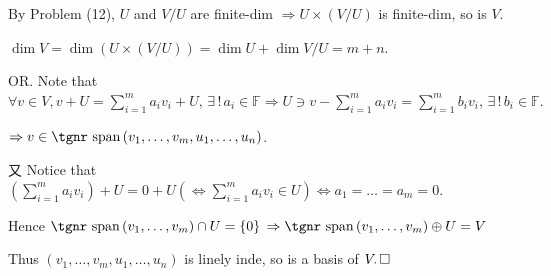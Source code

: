 \documentclass[a4paper, 11pt, UTF8]{article}
\def\Spn{{\textup{\tgnr span}}\,}
\def\Fbb{{\mathbb{F}}}
\def\Or{{\large O{\footnotesize R.} }}
\begin{document}
\begin{large}
\par\quad
By Problem (12), $U$ and $V/U$ are finite-dim $\Rightarrow U\times(V/U)$ is finite-dim, so is $V$.\par\quad
$\dim V=\dim\left(U\times(V/U)\right)=\dim U+\dim V/U=m+n.$\par\quad
\Or Note that $\forall v\in V,v+U=\sum\limits_{i=1}^m a_i v_i+U,\,\exists\,!\,a_i\in\Fbb\Rightarrow U\ni v-\sum\limits_{i=1}^m a_i v_i=\sum\limits_{i=1}^m b_i v_i,\,\exists\,!\,b_i\in\Fbb.$\par\quad\qquad\qquad\qquad\!\!\!
$\Rightarrow v\in\Spn(v_1,\dots,v_m,u_1,\dots,u_n)$.\par\quad
又 Notice that $(\sum\limits_{i=1}^m a_i v_i)+U=0+U(\Longleftrightarrow\sum\limits_{i=1}^m a_i v_i\in U)\Longleftrightarrow a_1=\dots=a_m=0.$\par\quad
Hence $\Spn(v_1,\dots,v_m)\cap U=\{0\}$
$\Rightarrow\Spn(v_1,\dots,v_m)\oplus U=V$\par\quad
Thus $(v_1,\dots,v_m,u_1,\dots,u_n)$ is linely inde, so is a basis of $V.\,\hfill\square$\par
\SepLine\par


\end{large}
\end{document}
